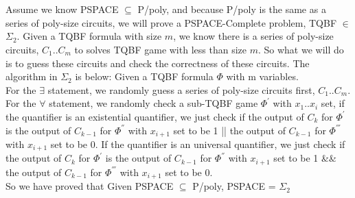 \documentclass[11pt]{article}
\begin{document}
\part{}
Assume we know PSPACE $\subseteq$ P/poly, and because P/poly is the same as a series of poly-size circuits, we will prove a PSPACE-Complete problem, TQBF $\in$ $\Sigma_{2}$. Given a TQBF formula with size $m$, we know there is a series of poly-size circuits, $C_{1}..C_{m}$ to solves TQBF game with less than size $m$. So what we will do is to guess these circuits and check the correctness of these circuits. The algorithm in $\Sigma_{2}$ is below:
Given a TQBF formula $\Phi$ with m variables. \\
For the $\exists$ statement, we randomly guess a series of poly-size circuits first, $C_{1}..C_{m}$. \\
For the $\forall$ statement, we randomly check a sub-TQBF game $\Phi^{'}$ with $x_{1}..x_{i}$ set, if the quantifier is an existential quantifier, we just check if the output of $C_{k}$ for $\Phi^{'}$ is 
the output of $C_{k-1}$ for $\Phi^{''}$ with $x_{i+1}$ set to be 1 || the output of $C_{k-1}$ for $\Phi^{'''}$ with $x_{i+1}$ set to be 0. If the quantifier is an universal quantifier, we just check if the output of $C_{k}$ for $\Phi^{'}$ is the output of $C_{k-1}$ for $\Phi^{''}$ with $x_{i+1}$ set to be 1 \&\& the output of $C_{k-1}$ for $\Phi^{'''}$ with $x_{i+1}$ set to be 0. \\
So we have proved that Given PSPACE $\subseteq$ P/poly, PSPACE = $\Sigma_{2}$
\end{document}

